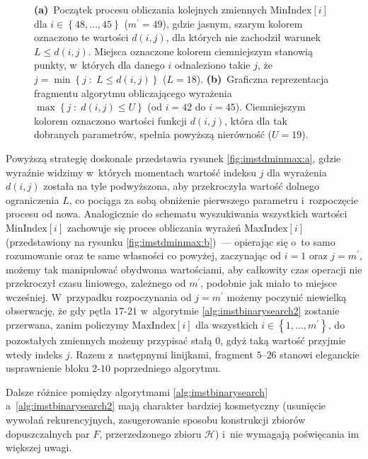 \begin{figure}[!htbp]
{		\textbf{(a)}~Początek procesu obliczania kolejnych zmiennych $\text{MinIndex} \left[ i \right]$ dla $i \in \left\{ 48, \dots, 45 \right\}$ ($m^{\prime} = 49$), gdzie jasnym, szarym kolorem oznaczono te wartości $d \left( i, j \right)$, dla których nie zachodził warunek $L \leqslant d \left( i, j \right)$.
		Miejsca oznaczone kolorem ciemniejszym stanowią punkty, w~których dla danego $i$ odnaleziono takie $j$, że $j = \min \left\{ j \; : \; L \leqslant d \left( i, j \right) \right\}$ ($L = 18$).
		\textbf{(b)}~Graficzna reprezentacja fragmentu algorytmu obliczającego wyrażenia $\max \left\{ j \; : \; d \left( i, j \right) \leqslant U \right\}$ (od $i = 42$ do $i = 45$).
		Ciemniejszym kolorem oznaczono wartości funkcji $d \left( i, j \right)$, która dla tak dobranych parametrów, spełnia powyższą nierówność ($U = 19$).
	}
	\label{fig:imstdminmax}
\end{figure}

Powyższą strategię doskonale przedstawia rysunek \ref{fig:imstdminmax:a}, gdzie wyraźnie widzimy w~których momentach wartość indeksu $j$ dla wyrażenia $d \left( i, j \right)$ została na tyle podwyższona, aby przekroczyła wartość dolnego ograniczenia $L$, co pociąga za sobą obniżenie pierwszego parametru i~rozpoczęcie procesu od nowa.
Analogicznie do schematu wyszukiwania wszystkich wartości $\text{MinIndex} \left[ i \right]$ zachowuje się proces obliczania wyrażeń $\text{MaxIndex} \left[ i \right]$ (przedstawiony na rysunku \ref{fig:imstdminmax:b})~--- opierając się o~to samo rozumowanie oraz te same własności co powyżej, zaczynając od $i = 1$ oraz $j = m^{\prime}$, możemy tak manipulować obydwoma wartościami, aby całkowity czas operacji nie przekroczył czasu liniowego, zależnego od $m^{\prime}$, podobnie jak miało to miejsce wcześniej.
W~przypadku rozpoczynania od $j = m^{\prime}$ możemy poczynić niewielką obserwację, że gdy pętla $17$-$21$ w~algorytmie \ref{alg:imstbinarysearch2} zostanie przerwana, zanim policzymy $\text{MaxIndex} \left[ i \right]$ dla wszystkich $i \in \left\{ 1, \dots, m^{\prime} \right\}$, do pozostałych zmiennych możemy przypisać stałą $0$, gdyż taką wartość przyjmie wtedy indeks $j$.
Razem z~następnymi linijkami, fragment $5$--$26$ stanowi eleganckie usprawnienie bloku $2$-$10$ poprzedniego algorytmu.

Dalsze różnice pomiędzy algorytmami \ref{alg:imstbinarysearch} a~\ref{alg:imstbinarysearch2} mają charakter bardziej kosmetyczny (usunięcie wywołań rekurencyjnych, zasugerowanie sposobu konstrukcji zbiorów dopuszczalnych par $F$, przerzedzonego zbioru $\mathcal{H}$) i~nie wymagają poświęcania im większej uwagi.

